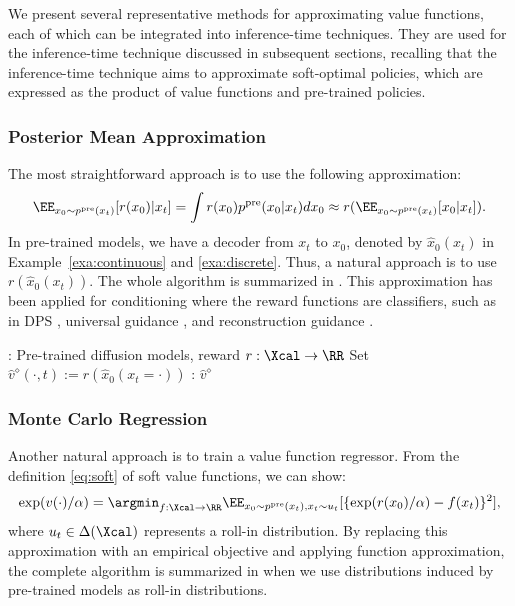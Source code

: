 We present several representative methods for approximating value functions, each of which can be integrated into inference-time techniques. They are used for the inference-time technique discussed in subsequent sections, recalling that the inference-time technique aims to approximate soft-optimal policies, which are expressed as the product of value functions and pre-trained policies.

\subsubsection{Posterior Mean Approximation}\label{sec:posterior_mean}

The most straightforward approach is to use the following approximation:
\begin{align*}
    \EE_{x_0\sim p^{\pre}(x_t) } [r(x_0)|x_t]=\int r(x_0)p^{\pre}(x_0|x_t)dx_0\approx r(\EE_{x_0\sim p^{\pre}(x_t) }[x_0|x_t]). 
\end{align*}
In pre-trained models, we have a decoder from $x_t$ to $x_0$, denoted by $\hat x_0(x_t)$ in Example~\ref{exa:continuous} and \ref{exa:discrete}. Thus, a natural approach is to use $r(\hat{x}_0(x_t))$. The whole algorithm is summarized in . This approximation has been applied for conditioning where the reward functions are classifiers, such as in DPS \citep{chung2022diffusion}, universal guidance \citep{bansal2023universal}, and reconstruction guidance \citep{ho2022video}. 

\begin{algorithm}[!th]
\caption{Value Function Estimation using Posterior Mean Approximation}\label{alg:PM}

\begin{algorithmic}[!th] 
     :  Pre-trained diffusion models, reward $r:\Xcal \to \RR$
    \STATE  Set $\hat v^{\diamond}(\cdot,t):= r(\hat x_0(x_t=\cdot))$ 
      : $ \hat v^{\diamond}$
\end{algorithmic}
\end{algorithm}


\subsubsection{Monte Carlo Regression}

Another natural approach is to train a value function regressor. From the definition \eqref{eq:soft} of soft value functions, we can show:
\begin{align*}
    \exp(v(\cdot)/\alpha)=\argmin_{f: \Xcal \to \RR}\EE_{x_0\sim p^{\pre}(x_t), x_t\sim u_t}[\{\exp(r(x_0)/\alpha)- f(x_t)\}^2],   
\end{align*}
where $u_t \in \Delta(\Xcal)$ represents a roll-in distribution. By replacing this approximation with an empirical objective and applying function approximation, the complete algorithm is summarized in  when we use distributions induced by pre-trained models as roll-in distributions. 



